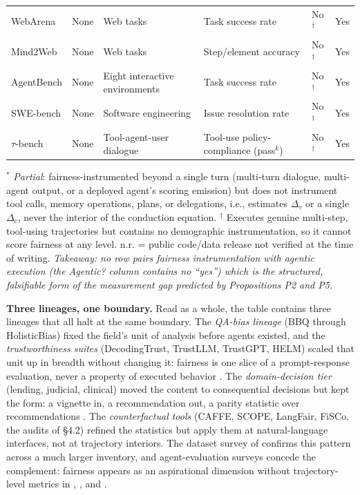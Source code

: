 \documentclass[acmsmall,nonacm]{acmart}
\begin{document}
\begin{longtable}{|p{}|p{}|p{}|p{}|p{}|p{}|}
WebArena \cite{zhou2024webarena} & None & Web tasks & Task success rate & No$^{\dagger}$ & Yes \\
Mind2Web \cite{deng2023mind2web} & None & Web tasks & Step/element accuracy & No$^{\dagger}$ & Yes \\
AgentBench \cite{liu2024agentbench} & None & Eight interactive environments & Task success rate & No$^{\dagger}$ & Yes \\
SWE-bench \cite{jimenez2024swe} & None & Software engineering & Issue resolution rate & No$^{\dagger}$ & Yes \\
$\tau$-bench \cite{yao2024taubench} & None & Tool-agent-user dialogue & Tool-use policy-compliance (pass$^{k}$) & No$^{\dagger}$ & Yes \\
\end{longtable}
\endgroup

$^{\ast}$ \emph{Partial}: fairness-instrumented beyond a single turn (multi-turn dialogue, multi-agent output, or a deployed agent's scoring emission) but does not instrument tool calls, memory operations, plans, or delegations, i.e., estimates $\Delta_\tau$ or a single $\Delta_c$, never the interior of the conduction equation. $^{\dagger}$ Executes genuine multi-step, tool-using trajectories but contains no demographic instrumentation, so it cannot score fairness at any level. n.r. = public code/data release not verified at the time of writing. \emph{Takeaway: no row pairs fairness instrumentation with agentic execution (the Agentic? column contains no ``yes'') which is the structured, falsifiable form of the measurement gap predicted by Propositions P2 and P5.}

\textbf{Three lineages, one boundary.} Read as a whole, the table contains three lineages that all halt at the same boundary. The \emph{QA-bias lineage} (BBQ through HolisticBias) fixed the field's unit of analysis before agents existed, and the \emph{trustworthiness suites} (DecodingTrust, TrustLLM, TrustGPT, HELM) scaled that unit up in breadth without changing it: fairness is one slice of a prompt-response evaluation, never a property of executed behavior \cite{wang2023decodingtrust,huang2024trustllm,liang2023holistic}. The \emph{domain-decision tier} (lending, judicial, clinical) moved the content to consequential decisions but kept the form: a vignette in, a recommendation out, a parity statistic over recommendations \cite{azime2025accept,hu2025llms}. The \emph{counterfactual tools} (CAFFE, SCOPE, LangFair, FiSCo, the audits of \S{}4.2) refined the statistics but apply them at natural-language interfaces, not at trajectory interiors. The dataset survey of \cite{zhang2025datasets} confirms this pattern across a much larger inventory, and agent-evaluation surveys concede the complement: fairness appears as an aspirational dimension without trajectory-level metrics in \cite{mohammadi2025evaluation}, \cite{yehudai2025survey}, and \cite{chang2024survey}.
\end{document}
